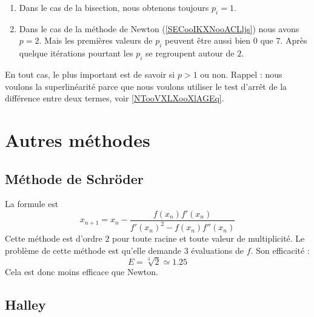 \begin{enumerate}
    \item
Dans le cas de la bisection, nous obtenons toujours \( p_i=1\).
\item
    Dans le cas de la méthode de Newton (\ref{SECooIKXNooACLljs}) nous avons \( p=2\). Mais les premières valeurs de \( p_i\) peuvent être aussi bien \( 0\) que \( 7\). Après quelque itérations pourtant les \( p_i\) se regroupent autour de \( 2\).
\end{enumerate}
En tout cas, le plus important est de savoir si \( p>1\) ou non. Rappel : nous voulons la superlinéarité parce que nous voulons utiliser le test d'arrêt de la différence entre deux termes, voir \ref{NTooVXLXooXlAGEq}. 

\section{Autres méthodes}

\subsection{Méthode de Schröder}

La formule est
\begin{equation}
    x_{n+1}=x_n-\frac{ f(x_n)f'(x_n) }{ f'(x_n)^2-f(x_n)f''(x_n) }
\end{equation}
Cette méthode est d'ordre \( 2\) pour toute racine et toute valeur de multiplicité. Le problème de cette méthode est qu'elle demande \( 3\) évaluations de \( f\). Son efficacité :
\begin{equation}
    E=\sqrt[3]{ 2 }\simeq 1.25
\end{equation}
Cela est donc moins efficace que Newton.

\subsection{Halley}

